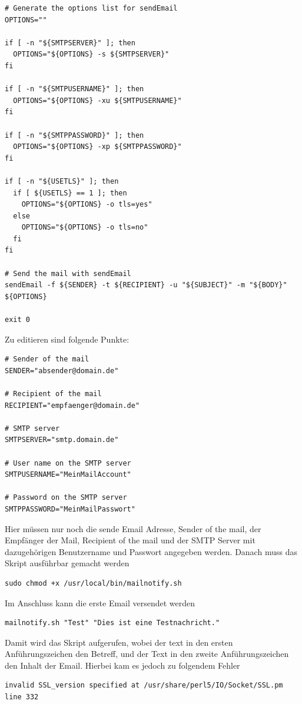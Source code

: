 \documentclass[11pt,a4paper]{article} %
\begin{document}
\begin{frame}
\begin{lstlisting}
# Generate the options list for sendEmail
OPTIONS=""

if [ -n "${SMTPSERVER}" ]; then
  OPTIONS="${OPTIONS} -s ${SMTPSERVER}"
fi

if [ -n "${SMTPUSERNAME}" ]; then
  OPTIONS="${OPTIONS} -xu ${SMTPUSERNAME}"
fi

if [ -n "${SMTPPASSWORD}" ]; then
  OPTIONS="${OPTIONS} -xp ${SMTPPASSWORD}"
fi

if [ -n "${USETLS}" ]; then
  if [ ${USETLS} == 1 ]; then
    OPTIONS="${OPTIONS} -o tls=yes"
  else
    OPTIONS="${OPTIONS} -o tls=no"
  fi
fi

# Send the mail with sendEmail
sendEmail -f ${SENDER} -t ${RECIPIENT} -u "${SUBJECT}" -m "${BODY}" ${OPTIONS}

exit 0
\end{lstlisting}
\end{frame}

Zu editieren sind folgende Punkte:
\begin{frame}

\begin{lstlisting}
# Sender of the mail
SENDER="absender@domain.de"

# Recipient of the mail
RECIPIENT="empfaenger@domain.de"

# SMTP server
SMTPSERVER="smtp.domain.de"

# User name on the SMTP server
SMTPUSERNAME="MeinMailAccount"

# Password on the SMTP server
SMTPPASSWORD="MeinMailPasswort"
\end{lstlisting}
\end{frame}
Hier müssen nur noch die sende Email Adresse, Sender of the mail, der Empfänger der Mail, Recipient of the mail und der SMTP Server mit dazugehörigen Benutzername und Passwort angegeben werden.
Danach muss das Skript ausf\"uhrbar gemacht werden
\begin{frame}

\begin{lstlisting}
sudo chmod +x /usr/local/bin/mailnotify.sh
\end{lstlisting}
\end{frame}

Im Anschluss kann die erste Email versendet werden
\begin{frame}

\begin{lstlisting}
mailnotify.sh "Test" "Dies ist eine Testnachricht."

\end{lstlisting}
\end{frame}
\newpage
Damit wird das Skript aufgerufen, wobei der text in den ersten Anf\"uhrungszeichen den Betreff, und der Text in den zweite Anführungszeichen den Inhalt der Email.
Hierbei kam es jedoch zu folgendem Fehler
\begin{frame}

\begin{lstlisting}
invalid SSL_version specified at /usr/share/perl5/IO/Socket/SSL.pm line 332

\end{lstlisting}
\end{frame}
\end{document}
